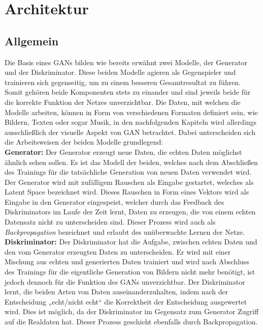 \section{Architektur}

\subsection{Allgemein}

\noindent Die Basis eines \acp{GAN} bilden wie bereits erwähnt zwei Modelle, der Generator und der Diskriminator. Diese beiden Modelle agieren als Gegenspieler und trainieren sich gegenseitig, um zu einem besseren Gesamtresultat zu führen. Somit gehören beide Komponenten stets zu einander und sind jeweils beide für die korrekte Funktion der Netzes unverzichtbar. Die Daten, mit welchen die Modelle arbeiten, können in Form von verschiedenen Formaten definiert sein, wie Bildern, Texten oder sogar Musik, in den nachfolgenden Kapiteln wird allerdings ausschließlich der visuelle Aspekt von \acs{GAN} betrachtet. Dabei unterscheiden sich die Arbeitsweisen der beiden Modelle grundlegend: \\

\noindent \textbf{Generator:} Der Generator erzeugt neue Daten, die echten Daten möglichst ähnlich sehen sollen. Es ist das Modell der beiden, welches nach dem Abschließen des Trainings für die tatsächliche Generation von neuen Daten verwendet wird. Der Generator wird mit zufälligem Rauschen als Eingabe gestartet, weleches als Latent Space bezeichnet wird. Dieses Rauschen in Form eines Vektors wird als Eingabe in den Generator eingespeist, welcher durch das Feedback des Diskriminators im Laufe der Zeit lernt, Daten zu erzeugen, die von einem echten Datensatz nicht zu unterscheiden sind. Dieser Prozess wird auch als \textit{Backpropagation} bezeichnet und erlaubt des unüberwachte Lernen der Netze. \\

\noindent \textbf{Diskriminator:} Der Diskriminator hat die Aufgabe, zwischen echten Daten und den vom Generator erzeugten Daten zu unterscheiden. Er wird mit einer Mischung aus echten und generierten Daten trainiert und wird nach Abschluss des Trainings für die eigentliche Generation von Bildern nicht mehr benötigt, ist jedoch dennoch für die Funktion des \acp{GAN} unverzichtbar. Der Diskriminator lernt, die beiden Arten von Daten auseinanderzuhalten, indem nach der Entscheidung „echt/nicht echt“ die Korrektheit der Entscheidung ausgewertet wird. Dies ist möglich, da der Diskriminator im Gegensatz zum Generator Zugriff auf die Realdaten hat. Dieser Prozess geschieht ebenfalls durch Backpropagation. \\

